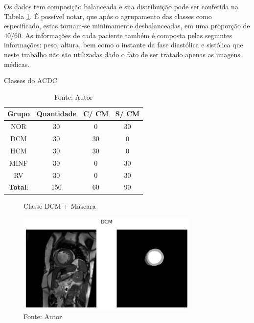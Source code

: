 Os dados tem composição balanceada e sua distribuição pode ser conferida na Tabela \ref{tab:count_dataset}. É possível notar, que após o agrupamento das classes como especificado, estas tornam-se minimamente desbalanceadas, em uma proporção de $40/60$. As informações de cada paciente também é composta pelas seguintes informações: peso, altura, bem como o instante da fase diastólica e sistólica \cite{bernardDeepLearningTechniques2018a} que neste trabalho não são utilizadas dado o fato de ser tratado apenas as imagens médicas.

\begin{table}[H]
    \centering
    \caption{Classes do ACDC}
    \renewcommand{\arraystretch}{1} %
    \begin{tabular}{|c|c|c|c|}
    \hline 
          \textbf{Grupo} & \textbf{Quantidade} & \textbf{C/ CM} & \textbf{S/ CM}  \\ 
    \hline 
        NOR & 30 & 0 & 30 \\ 
        DCM & 30 & 30 & 0\\ 
        HCM & 30 & 30 & 0\\ 
        MINF & 30 & 0 & 30 \\ 
        RV & 30 & 0 & 30 \\
    \hline 
        \textbf{Total}: & 150  & 60 & 90\\ 
    \hline 
    \end{tabular} 
    \caption*{Fonte: Autor}
    \label{tab:count_dataset}
\end{table}


\begin{figure}[H]
    \centering
    \caption{Classe DCM + Máscara}
    \includegraphics[width=0.8\textwidth]{figures/fig033-01.png}
    \caption*{Fonte: Autor}
    \label{fig:fig033-01}
\end{figure}

